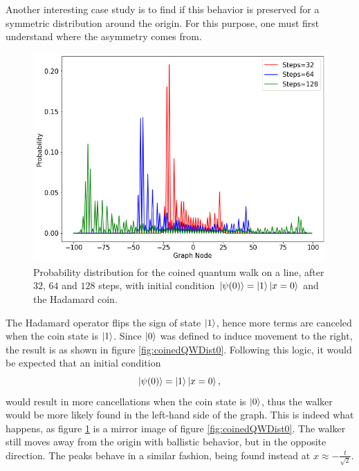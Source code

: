 \documentclass[../../dissertation.tex]{subfiles}
\begin{document}
Another interesting case study is to find if this behavior is preserved for a
symmetric distribution around the origin. For this purpose, one must first
understand where the asymmetry comes from.
\begin{figure}[!h]
	\centering
	\includegraphics[scale=0.40]{img/CoinedQuantumWalk/CoinedMultiple_psi1_3264128.png}
	\caption{Probability distribution for the coined quantum walk on a line, after $32$, $64$ and $128$ steps, with initial condition $\ket{\psi(0)}=\ket{1}\ket{x=0}$ and the Hadamard coin.} 
	\label{fig:coinedQWDist1}
\end{figure}
The Hadamard operator flips the sign of state $\ket{1}$, hence more terms are
canceled when the coin state is $\ket{1}$. Since $\ket{0}$ was defined to
induce movement to the right, the result is as shown in figure
\ref{fig:coinedQWDist0}. Following this logic, it would be expected that an
initial condition 
\begin{equation}
	\ket{\psi(0)} = \ket{1}\ket{x=0},
	\label{eq:coinedQWInitCond1}
\end{equation}
would result in more cancellations when the coin state is $\ket{0}$, thus the
walker would be more likely found in the left-hand side of the graph. This is
indeed what happens, as figure \ref{fig:coinedQWDist1} is a mirror image of
figure \ref{fig:coinedQWDist0}. The walker still moves away from the origin
with ballistic behavior, but in the opposite direction. The peaks behave in a
similar fashion, being found instead at $x \approx -\frac{t}{\sqrt{2}}$.\par
\end{document}
